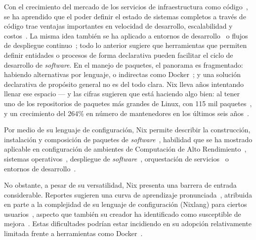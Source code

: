 Con el crecimiento del mercado de los servicios de infraestructura como código~\cite{grandviewresearchInfrastructureCodeMarket}, se ha aprendido que el poder definir el estado de sistemas completos a través de código trae ventajas importantes en velocidad de desarrollo, escalabilidad y costos~\cite{pandyaIntroductionInfrastructureCode2022}. La misma idea también se ha aplicado a entornos de desarrollo~\cite{ghanbariUsingDevelopmentEnvironment2026} o flujos de despliegue continuo~\cite{wesselGitHubActionsImpact2023}; todo lo anterior sugiere que herramientas que permiten definir entidades o procesos de forma declarativa pueden facilitar el ciclo de desarrollo de \emph{software}. En el manejo de paquetes, el panorama es fragmentado: habiendo alternativas por lenguaje, o indirectas como Docker~\cite{Zwinger2026}; y una solución declarativa de propósito general no es del todo clara. Nix lleva años intentando llenar ese espacio --- y las cifras sugieren que está haciendo algo bien: al tener uno de los repositorios de paquetes más grandes de Linux, con 115 mil paquetes~\cite{marakasovRepositoryStatistics}, y un crecimiento del 264\% en número de mantenedores en los últimos seis años~\cite{gg-solutionsLinuxSilentTech2026}.

Por medio de su lenguaje de configuración, Nix permite describir la construcción, instalación y composición de paquetes de \emph{software}~\cite{Dolstra2006}, habilidad que se ha mostrado aplicable en configuración de ambientes de Computación de Alto Rendimiento~\cite{guilloteauPainlessTranspositionReproducible2022,Gomez2020}, sistemas operativos~\cite{Thiberg2025}, despliegue de \emph{software}~\cite{VanDerBurg2014}, orquestación de servicios~\cite{FloxKubernetesUncontained} o entornos de desarrollo~\cite{replitReplitHowWe2021}.

No obstante, a pesar de su versatilidad, Nix presenta una barrera de entrada considerable. Reportes sugieren una curva de aprendizaje pronunciada~\cite{NixCommunitySurvey2024}, atribuida en parte a la complejidad de su lenguaje de configuración (Nixlang) para ciertos usuarios~\cite{fricklerhandwerk2022}, aspecto que también su creador ha identificado como susceptible de mejora~\cite{Dolstra2018}. Estas dificultades podrían estar incidiendo en su adopción relativamente limitada frente a herramientas como Docker~\cite{stackoverflowMostPopularTechnologies}.

